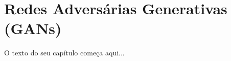 
\chapter{Redes Adversárias Generativas (GANs)}
\label{cap:gans}

O texto do seu capítulo começa aqui...